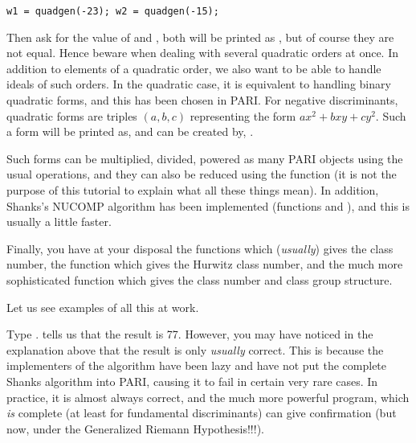 \centerline{\tt w1 = quadgen(-23); w2 = quadgen(-15);}

Then ask for the value of  and , both will be printed as
, but of course they are not equal. Hence beware when dealing with
several quadratic orders at once. \smallskip
%
In addition to elements of a quadratic order, we also want to be able to
handle ideals of such orders. In the quadratic case, it is equivalent to
handling binary quadratic forms, and this has been chosen in PARI. For
negative discriminants, quadratic forms are triples $(a,b,c)$ representing
the form $ax^2+bxy+cy^2$. Such a form will be printed as, and can be created
by, .

Such forms can be multiplied, divided, powered as many PARI objects using
the usual operations, and they can also be reduced using the function
 (it is not the purpose of this tutorial to explain what all
these things mean). In addition, Shanks's NUCOMP algorithm has been
implemented (functions  and ), and this is
usually a little faster.

Finally, you have at your disposal the functions  which
({\it usually\/}) gives the class number, the function 
which gives the Hurwitz class number, and the much more sophisticated
 function which gives the class number and class group
structure.

Let us see examples of all this at work.

Type .  tells us that the result is 77. However,
you may have noticed in the explanation above that the result is only
{\it usually\/} correct. This is because the implementers of the algorithm
have been lazy and have not put the complete Shanks algorithm into PARI,
causing it to fail in certain very rare cases. In practice, it is almost
always correct, and the much more powerful  program, which
{\it is} complete (at least for fundamental discriminants) can give
confirmation (but now, under the Generalized Riemann Hypothesis!!!).

